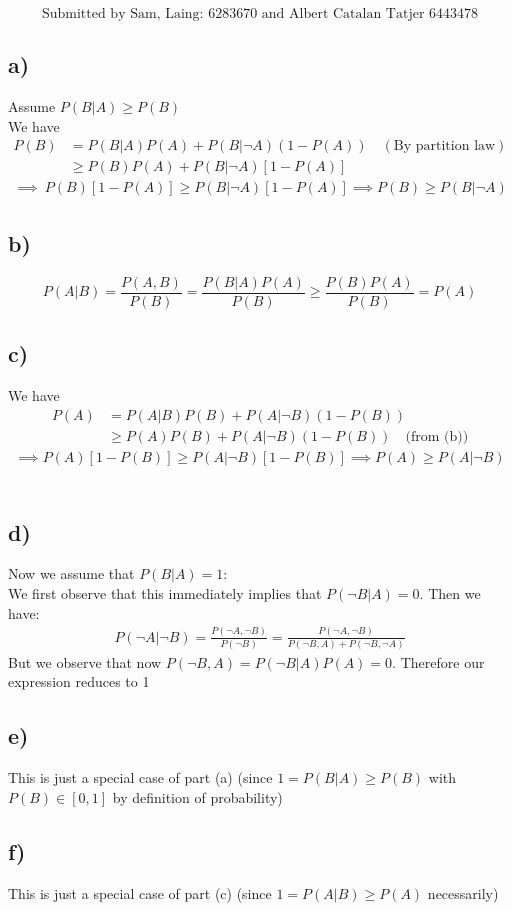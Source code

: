 \documentclass[12pt]{article}
\begin{document}
\begin{center}
\Huge{}
\end{center}
\[
	\text{Submitted by Sam, Laing: 6283670 and Albert Catalan Tatjer 6443478} 
\] 
\subsection*{a)}
Assume $P(B|A) \ge P(B)$\\
We have
\begin{align*}
	P(B) &= P(B|A)P(A)+P(B|\neg A)(1-P(A)) \quad (\text{By partition law})\\
	     &\ge P(B)P(A) + P(B|\neg A)[1-P(A)]  
\end{align*}
\begin{align*}
	\implies \ P(B) [ 1-P(A)] \ge  P(B|\neg A) [1-P(A)] \implies P(B) \ge P(B|\neg A)
\end{align*}
\subsection*{b)} 
\[
	P(A|B) = \frac{P(A,B)}{P(B)} = \frac{P(B|A)P(A)}{P(B)} \ge  \frac{P(B)P(A)}{P(B)} = P(A)
\] 
\subsection*{c)} 
We have 
\begin{align*}
	P(A) &= P(A|B)P(B) + P(A|\neg B)(1-P(B)) \\
	     &\ge P(A)P(B) + P(A|\neg B)(1-P(B)) \quad \text{(from (b))}
\end{align*}
\begin{align*}
	\implies P(A)[1-P(B)] \ge  P(A|\neg B)[1-P(B)] \implies P(A) \ge P(A|\neg B)
\end{align*}
\\
\subsection*{d)} 
Now we assume that $P(B|A) = 1$:\\
We first observe that this immediately implies that $P(\neg B|A) = 0$.
Then we have:
 \begin{align*}
	 P(\neg A|\neg B) = \frac{P(\neg A,\neg B)}{P(\neg B)} = \frac{P(\neg A,\neg B)}{P(\neg B,A) + P(\neg B,\neg A)} 
\end{align*}
But we observe that now $P(\neg B,A) = P(\neg B|A)P(A) = 0$. Therefore our expression reduces to 1
\subsection*{e)} 
This is just a special case of part (a) (since $1 = P(B|A) \ge P(B)$ with $P(B) \in [0,1]$ by definition of probability)
\subsection*{f)} 
This is just a special case of part (c) (since $1 = P(A|B) \ge P(A)$ necessarily)
\end{document}

